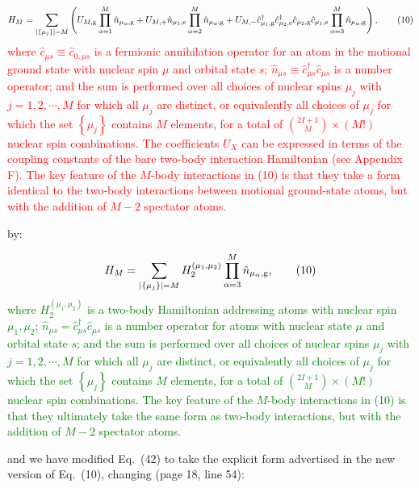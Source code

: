 \documentclass[preprint]{revtex4-1}
\newcommand{\p}[1]{\left(#1\right)} %
\renewcommand{\set}[1]{\left\{#1\right\}} %
\newcommand{\g}{\text{g}}
\newcommand{\e}{\text{e}}
\renewcommand{\c}{\hat{c}}
\newcommand{\n}{\hat{n}}
\newcommand{\1}{\mathds{1}}
\newcommand{\red}[1]{\textcolor{red}{#1}}
\newcommand{\green}[1]{\textcolor{green}{#1}}
\begin{document}
\begin{enumerate}
  \red{\begin{align*} H_M = \sum_{\abs{\set{\mu_j}}=M} \p{U_{M,\g}
        \prod_{\alpha=1}^M \n_{\mu_\alpha,\g} + U_{M,+} \n_{\mu_1,\e}
        \prod_{\alpha=2}^M \n_{\mu_\alpha,\g} + U_{M,-}
        \c_{\mu_1,\g}^\dag \c_{\mu_2,\e}^\dag \c_{\mu_2,\g}
        \c_{\mu_1,\e} \prod_{\alpha=3}^M \n_{\mu_\alpha,\g}},
      \tag{10}
    \end{align*}
    where $\c_{\mu s}\equiv\c_{0,\mu s}$ is a fermionic annihilation
    operator for an atom in the motional ground state with nuclear
    spin $\mu$ and orbital state $s$;
    $\n_{\mu s}\equiv \c_{\mu s}^\dag \c_{\mu s}$ is a number
    operator; and the sum is performed over all choices of nuclear
    spins $\mu_j$ with $j=1,2,\cdots,M$ for which all $\mu_j$ are
    distinct, or equivalently all choices of $\mu_j$ for which the set
    $\set{\mu_j}$ contains $M$ elements, for a total of
    ${2I+1\choose M}\times\p{M!}$ nuclear spin combinations.  The
    coefficients $U_X$ can be expressed in terms of the coupling
    constants of the bare two-body interaction Hamiltonian (see
    Appendix F).  The key feature of the $M$-body interactions in (10)
    is that they take a form identical to the two-body interactions
    between motional ground-state atoms, but with the addition of
    $M-2$ spectator atoms.}

  by:

  \green{\begin{align*}
      H_M = \sum_{\abs{\set{\mu_j}}=M}
      H_2^{(\mu_1,\mu_2)} \prod_{\alpha=3}^M \n_{\mu_\alpha,\g},
      \tag{10}
    \end{align*}
    where $H_2^{(\mu_1,\mu_2)}$ is a two-body Hamiltonian addressing
    atoms with nuclear spin $\mu_1,\mu_2$;
    $\n_{\mu s}=\c_{\mu s}^\dag\c_{\mu s}$ is a number operator for
    atoms with nuclear state $\mu$ and orbital state $s$; and the sum
    is performed over all choices of nuclear spins $\mu_j$ with
    $j=1,2,\cdots,M$ for which all $\mu_j$ are distinct, or
    equivalently all choices of $\mu_j$ for which the set
    $\set{\mu_j}$ contains $M$ elements, for a total of
    ${2I+1\choose M}\times\p{M!}$ nuclear spin combinations.  The key
    feature of the $M$-body interactions in (10) is that they
    ultimately take the same form as two-body interactions, but with
    the addition of $M-2$ spectator atoms.}

  and we have modified Eq.~(42) to take the explicit form advertised
  in the new version of Eq.~(10), changing (page 18, line 54):


\end{enumerate}
\end{document}
